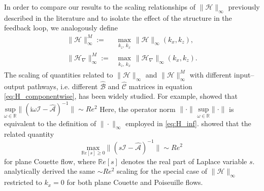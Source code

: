 In order to compare our results to the scaling relationships of  $\|\mathcal{H}\|_{\infty}$ previously described in the literature and to isolate the effect of the structure in the feedback loop, we analogously define
\begin{subequations}
\label{eq:H_inf_and_H_nabla_inf_M}
\begin{align}
    \|\mathcal{H}\|_{\infty}^M:=&\underset{\substack{k_z,\,k_x}}{\text{max}}\,\|\mathcal{H}\|_{\infty}(k_x,k_z),    \label{eq:H_inf_M}\\
    \|\mathcal{H}_{\nabla}\|_{\infty}^M:=&\underset{\substack{k_z,\,k_x}}{\text{max}}\,\|\mathcal{H}_{\nabla}\|_{\infty}(k_x,k_z). 
    \label{eq:H_nabla_inf_M}
\end{align} 
\end{subequations}
The scaling of quantities related to $\|\mathcal{H}\|_{\infty}$ and $ \|\mathcal{H}\|_{\infty}^M$ with different input--output pathways, i.e. different $\widehat{\mathcal{B}}$ and $\widehat{\mathcal{C}}$ matrices in equation \eqref{eq:H_componentwise}, has been widely studied. For example, \citet[table 1]{trefethen1993hydrodynamic} showed that $\underset{\omega\in \mathbb{R}}{\text{sup}}\|(\text{i}\omega\mathcal{I}-\widehat{\mathcal{A}})^{-1}\|\sim Re^2$  Here, the operator norm $\|\cdot\|$  $\underset{\omega\in \mathbb{R}}{\text{sup}}\|\cdot\|$ is equivalent to the definition of $\|\cdot\|_{\infty}$ employed in \eqref{eq:H_inf}. \citet{kreiss1994bounds} showed that the related quantity  \[ \underset{\mathbb{R}e[s]\geq0}{\text{max}}\|(s\mathcal{I}-\widehat{\mathcal{A}})^{-1}\|\sim Re^2\] for plane Couette flow, where $\mathbb{R}e[s]$ denotes the real part of Laplace variable $s$. \citet[theorem 11]{jovanovic2004modeling} analytically derived the same $\sim Re^2$ scaling for the special case of $\|\mathcal{H}\|_\infty$ restricted to $k_x=0$ for both plane Couette and Poiseuille flows.





